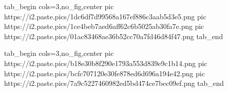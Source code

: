  
 
 
 
 
\zzSecCmtScr

\ifcmt
  tab_begin cols=3,no_fig,center
     pic https://i2.paste.pics/1dc6df7d99568a167ef886c3aab5d3e5.png
		 pic https://i2.paste.pics/1ce4beb7aed6aff62c6b5025ab30fa7e.png
		 pic https://i2.paste.pics/01ac83468ae36b52cc70a7fd46d84f47.png
  tab_end
\fi

\ifcmt
  tab_begin cols=3,no_fig,center
		 pic https://i2.paste.pics/b18e30b8f290e1793a553d839e9c1b14.png
		 pic https://i2.paste.pics/bcfc707120e30fe878ed6d696a194e42.png
		 pic https://i2.paste.pics/7a9c5227460982ed5bd474ce7bec09ef.png
  tab_end
\fi
